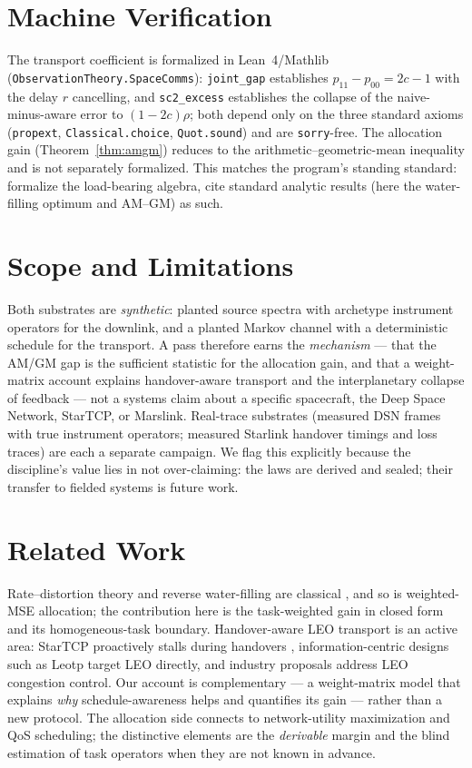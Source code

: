 \documentclass[11pt]{article}
\theoremstyle{definition}
\theoremstyle{remark}
\begin{document}
\section{Machine Verification}
\label{sec:verify}

The transport coefficient is formalized in Lean~4/Mathlib
(\texttt{ObservationTheory.SpaceComms}): \texttt{joint\_gap} establishes
$p_{11}-p_{00}=2c-1$ with the delay $r$ cancelling, and
\texttt{sc2\_excess} establishes the collapse of the naive-minus-aware
error to $(1-2c)\rho$; both depend only on the three standard axioms
(\texttt{propext}, \texttt{Classical.choice}, \texttt{Quot.sound}) and are
\texttt{sorry}-free. The allocation gain
(Theorem~\ref{thm:amgm}) reduces to the arithmetic--geometric-mean
inequality and is not separately formalized. This matches the program's
standing standard: formalize the load-bearing algebra, cite standard
analytic results (here the water-filling optimum and AM--GM) as such.

\section{Scope and Limitations}
\label{sec:scope}

Both substrates are \emph{synthetic}: planted source spectra with
archetype instrument operators for the downlink, and a planted Markov
channel with a deterministic schedule for the transport. A pass therefore
earns the \emph{mechanism} --- that the AM/GM gap is the sufficient
statistic for the allocation gain, and that a weight-matrix account
explains handover-aware transport and the interplanetary collapse of
feedback --- not a systems claim about a specific spacecraft, the Deep
Space Network, StarTCP, or Marslink. Real-trace substrates (measured DSN
frames with true instrument operators; measured Starlink handover timings
and loss traces) are each a separate campaign. We flag this explicitly
because the discipline's value lies in not over-claiming: the laws are
derived and sealed; their transfer to fielded systems is future work.

\section{Related Work}

Rate--distortion theory and reverse water-filling are classical
\cite{cover2006}, and so is weighted-MSE allocation; the contribution here is
the task-weighted gain in
closed form and its homogeneous-task boundary. Handover-aware LEO
transport is an active area: StarTCP proactively stalls during handovers
\cite{startcp2024}, information-centric designs such as Leotp target LEO
directly, and industry proposals address LEO congestion control. Our
account is complementary --- a weight-matrix model that explains
\emph{why} schedule-awareness helps and quantifies its gain --- rather
than a new protocol. The allocation side connects to network-utility
maximization and QoS scheduling; the distinctive elements are the
\emph{derivable} margin and the blind estimation of task operators
when they are not known in advance.
\end{document}
